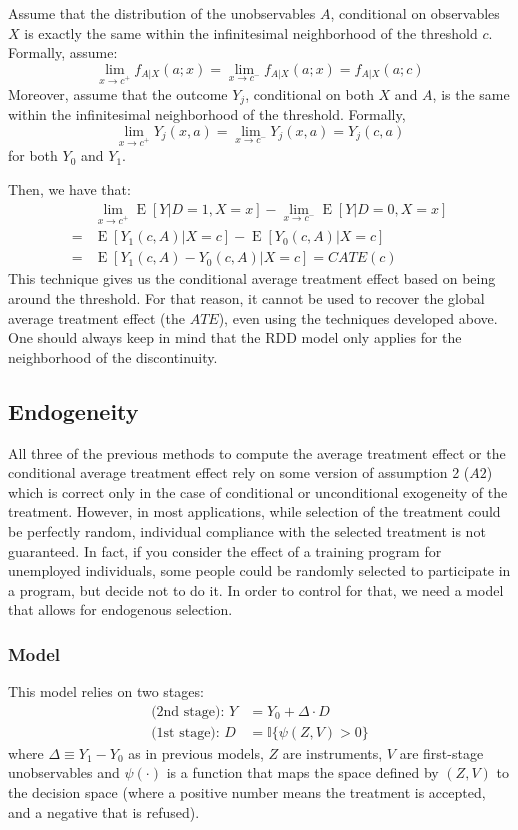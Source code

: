\documentclass[12pt]{report}
\newcommand{\E}[1]{\operatorname{E}\left[#1\right]}
\begin{document}
Assume that the distribution of the unobservables $A$, conditional on observables $X$ is exactly the same within the infinitesimal neighborhood of the threshold $c$. Formally, assume: $$\lim_{x\to c^+} f_{A\vert X}(a ;x) =  \lim_{x\to c^-} f_{A\vert X}(a ;x) = f_{A\vert X}(a ;c) $$ Moreover, assume that the outcome $Y_j$, conditional on both $X$ and $A$, is the same within the infinitesimal neighborhood of the threshold. Formally, $$\lim_{x\to c^+} Y_j(x, a) =  \lim_{x\to c^-} Y_j(x, a) = Y_j(c, a) $$ for both $Y_0$ and $Y_1$.

Then, we have that:\begin{align*}
& \lim_{x\to c^+} \E{Y\vert D=1, X=x} - \lim_{x\to c^-} \E{Y\vert D=0, X=x} \\ = & \E{Y_1(c, A)\vert X=c} - \E{Y_0(c, A)\vert X=c} \\ = & \E{Y_1(c, A) - Y_0(c, A)\vert X=c} = CATE(c)
\end{align*}
This technique gives us the conditional average treatment effect based on being around the threshold. For that reason, it cannot be used to recover the global average treatment effect (the $ATE$), even using the techniques developed above. One should always keep in mind that the RDD model only applies for the neighborhood of the discontinuity.

\subsection{Endogeneity}

All three of the previous methods to compute the average treatment effect or the conditional average treatment effect rely on some version of assumption 2 ($A2$) which is correct only in the case of conditional or unconditional exogeneity of the treatment. However, in most applications, while selection of the treatment could be perfectly random, individual compliance with the selected treatment is not guaranteed. In fact, if you consider the effect of a training program for unemployed individuals, some people could be randomly selected to participate in a program, but decide not to do it. In order to control for that, we need a model that allows for endogenous selection.

\subsubsection{Model}

This model relies on two stages: \begin{align*}
\text{(2nd stage): } Y & = Y_0 + \Delta\cdot D \\
\text{(1st stage): } D & = \mathbb{I}\{\psi(Z, V) > 0\}
\end{align*}
where $\Delta \equiv Y_1 - Y_0$ as in previous models, $Z$ are instruments, $V$ are first-stage unobservables and $\psi(\cdot)$ is a function that maps the space defined by $(Z, V)$ to the decision space (where a positive number means the treatment is accepted, and a negative that is refused).
\end{document}
